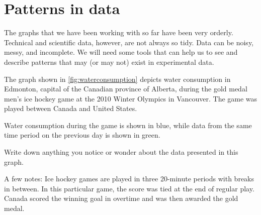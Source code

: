 
\section{Patterns in data}
\label{sec:patternsindata}

The graphs that we have been working with so far have been very orderly. Technical and scientific data, however, are not always so tidy. Data can be noisy, messy, and incomplete. We will need some tools that can help us to see and describe patterns that may (or may not) exist in experimental data.


\begin{boxexplore}
The graph shown in \cref{fig:waterconsumption} depicts water consumption in Edmonton, capital of the Canadian province of Alberta, during the gold medal men's ice hockey game at the 2010 Winter Olympics in Vancouver. The game was played between Canada and United States.

Water consumption during the game is shown in blue, while data from the same time period on the previous day is shown in green.

Write down anything you notice or wonder about the data presented in this graph.

A few notes: Ice hockey games are played in three 20-minute periods with breaks in between. In this particular game, the score was tied at the end of regular play. Canada scored the winning goal in overtime and was then awarded the gold medal.
\end{boxexplore}

